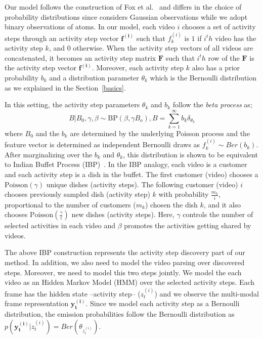 Our model follows the construction of Fox et al.~\cite{foxBPHMM} and differs in the choice of probability distributions since \cite{foxBPHMM} considers Gaussian observations while we adopt binary observations of atoms. In our model, each video $i$ chooses a set of activity steps through an activity step vector $\mathbf{f^{(i)}}$ such that $f^{(i)}_k$ is $1$ if $i^th$ video has the activity step $k$, and 0 otherwise. When the activity step vectors of all videos are concatenated, it becomes an activity step matrix $\mathbf{F}$ such that $i^th$ row of the $\mathbf{F}$ is the activity step vector $\mathbf{f^{(i)}}$. Moreover, each activity step $k$ also has a prior probability $b_k$  and a distribution parameter $\theta_k$ which is the Bernoulli distribution as we explained in the Section~\ref{basics}.

In this setting, the activity step parameters $\theta_k$ and $b_k$ follow the \emph{beta process} as;
\vskip -2mm
\begin{equation}
  B|B_0,\gamma,\beta \sim \text{BP}(\beta,\gamma B_o), B=\sum_{k=1}^\infty b_k \delta_{\theta_k}
\end{equation}
where $B_0$ and the $b_k$ are determined by the underlying Poisson process \cite{ibp} and the feature vector is determined as independent Bernoulli draws as $f_{k}^{(i)} \sim Ber(b_k)$. After marginalizing over the $b_k$ and $\theta_k$, this distribution is shown to be equivalent to Indian Buffet Process (IBP)~\cite{ibp}. In the IBP analogy, each video is a customer and each activity step is a dish in the buffet. The first customer (video) chooses a $\text{Poisson}(\gamma)$ unique dishes (activity steps). The following customer (video) $i$ chooses previously sampled dish (activity step) $k$ with probability $\frac{m_k}{i}$,  proportional to the number of customers ($m_k$) chosen the dish $k$, and it also chooses $\text{Poisson}(\frac{\gamma}{i})$ new dishes (activity steps). Here, $\gamma$ controls the number of selected activities in each video and $\beta$ promotes the activities getting shared by videos.

The above IBP construction represents the activity step discovery part of our method. In addition, we also need to model the video parsing over discovered steps. Moreover, we need to model this two steps jointly. We model the each video as an Hidden Markov Model (HMM) over the selected activity steps. Each frame has the hidden state --activity step-- ($z^{(i)}_t$) and we observe the multi-modal frame representation $\mathbf{y^{(i)}_t}$. Since we model each activity step as a Bernoulli distribution, the emission probabilities follow the Bernoulli distribution as $p(\mathbf{y^{(i)}_t}|z^{(i)}_t)=Ber(\theta_{z^{(i)}_t})$.

